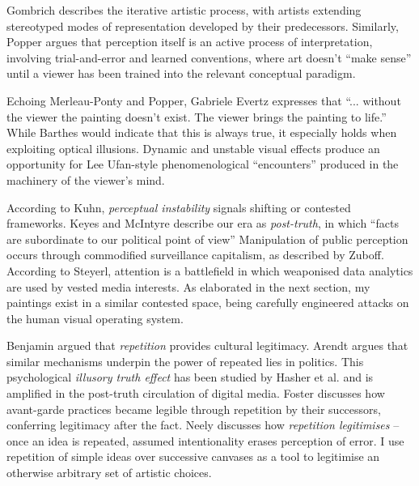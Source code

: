 \documentclass[12pt]{article}
\begin{document}
Gombrich describes the iterative artistic process, with artists
extending stereotyped modes of representation developed by their
predecessors.\autocite[Chapters II, V]{gombrich1960art} Similarly, Popper
argues that perception itself is an active process of interpretation,
involving trial-and-error and learned conventions, where art doesn't
``make sense'' until a viewer has been trained into the relevant
conceptual paradigm.\autocite[Chapter 2]{popper1972objective}

Echoing Merleau-Ponty\autocite{merleauPonty1962phenomenology} and
Popper,\autocite{popper1972objective} Gabriele Evertz expresses that
``... without the viewer the painting doesn't exist. The viewer brings
the painting to life.''\autocite{evertz09documentary} While Barthes
would indicate that this is always true,\autocite{barthes1977death} it
especially holds when exploiting optical illusions. Dynamic and
unstable visual effects produce an opportunity for Lee Ufan-style
phenomenological ``encounters''\autocite[pp.~52--6]{encounter} produced in
the machinery of the viewer's mind.

According to Kuhn, \emph{perceptual instability} signals shifting or
contested frameworks.\autocite[p.~64]{kuhn1970structure}
Keyes\autocite{keyes2004posttruth} and
McIntyre\autocite{mcintyre2018posttruth} describe our era as
\emph{post-truth}, in which ``facts are subordinate to our political point of view''\autocite[p.~11]{mcintyre2018posttruth} Manipulation of public perception occurs through
commodified surveillance capitalism, as described by
Zuboff.\autocite[pp.~8--12]{zuboff2019surveillance} According to
Steyerl,\autocite{steyerl2016sea} attention is a battlefield in which
weaponised data analytics are used by vested media interests. As
elaborated in the next section, my paintings exist in a similar
contested space, being carefully engineered attacks on the human visual
operating system.

Benjamin argued that \emph{repetition} provides cultural
legitimacy.\autocite{benjamin1935kunstwerk} Arendt argues that similar
mechanisms underpin the power of repeated lies in
politics.\autocite{arendt1972lying} This psychological \emph{illusory
  truth effect} has been studied by Hasher et
al.\autocite{hasher1977frequency} and is amplified in the
post-truth\autocite{keyes2004posttruth,mcintyre2018posttruth} circulation
of digital
media.\autocite{zuboff2019surveillance} Foster\autocite[pp.~29--30]{foster1996return}
discusses how avant-garde practices became legible through repetition
by their successors, conferring legitimacy after the fact. Neely
discusses how \emph{repetition legitimises} -- once an idea is repeated,
assumed intentionality erases perception of
error.\autocite{neely-repetition} I use repetition of simple ideas over
successive canvases as a tool to legitimise an otherwise arbitrary set
of artistic choices.
\end{document}
